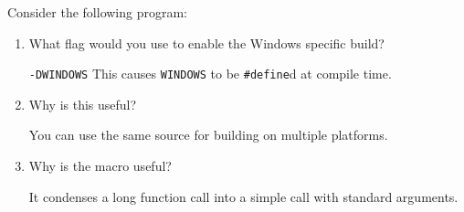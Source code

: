 Consider the following program:



\begin{enumerate}
	\item What flag would you use to enable the Windows specific build?

	\begin{answer}
		\texttt{-DWINDOWS}
		This causes \texttt{WINDOWS} to be \texttt{\#define}d at compile time.
	\end{answer}

	\item Why is this useful?

	\begin{answer}
		You can use the same source for building on multiple platforms.
	\end{answer}

	\item Why is the macro useful?

	\begin{answer}
		It condenses a long function call into a simple call with standard arguments.
	\end{answer}
\end{enumerate}
